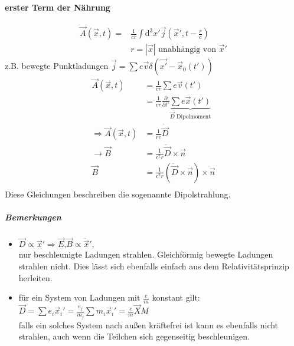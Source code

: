 \documentclass[a4paper]{article}
\begin{document}
\paragraph{erster Term der Nährung}
\begin{align}
\vec{A}(\vec{x},t)=&\frac{1}{cr}\int\mathrm{d}^3x' \vec{j}(\vec{x}',t-\frac{r}{c})\\
&r=|\vec{x}| \text{ unabhängig von }\vec{x}'
\end{align}
z.B. bewegte Punktladungen $\vec{j}=\sum e\vec{v}
\delta(\vec{x'}-\vec{x}_0(t'))$
\begin{align}
\vec{A}(\vec{x},t)&=\frac{1}{cr}\sum e\vec{v}(t')\\
&=\frac{1}{cr}\frac{\partial}{\partial t'}\underbrace{\sum
e\vec{x}(t')}_{\vec{D} \text{ Dipolmoment}}\\
\Rightarrow \vec{A}(\vec{x},t)&= \frac{1}{rc}\dot{\vec{D}}\\
\rightarrow \vec{B}&=\frac{1}{c^2r}\ddot{\vec{D}}\times\vec{n}\\
\vec{B}&=\frac{1}{c^2r}\left(\ddot{\vec{D}}\times\vec{n}\right)\times\vec{n}\\
\end{align}
Diese Gleichungen beschreiben die sogenannte Dipolstrahlung.
\subparagraph{Bemerkungen}
\begin{itemize}
  \item $\vec{D}\propto\vec{x}' \Rightarrow
  \vec{E}\text{,}\vec{B}\propto\ddot{\vec{x}}',$\\ nur beschleunigte Ladungen
  strahlen. Gleichförmig bewegte Ladungen strahlen nicht. Dies lässt sich
  ebenfalls einfach aus dem Relativitätsprinzip herleiten.
  \item für ein System von Ladungen mit $\frac{e}{m}$ konstant gilt:\\
  $\vec{D}=\sum e_i\vec{x}_i'=\frac{e_j}{m_j}\sum
  m_i\vec{x}_i'=\frac{e}{m}\vec{X}M$\\ falls ein solches System nach
  außen kräftefrei ist kann es ebenfalls nicht strahlen, auch wenn die Teilchen
  sich gegenseitig beschleunigen.
\end{itemize}
\end{document}

